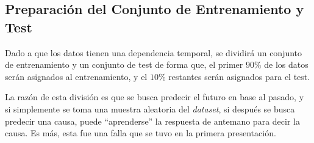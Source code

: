 




\subsection{Preparación del Conjunto de Entrenamiento y Test}
Dado a que los datos tienen una dependencia temporal, se dividirá un conjunto de entrenamiento y un conjunto de test de forma que, el primer $90\%$ de los datos serán asignados al entrenamiento, y el $10\%$ restantes serán asignados para el test. 

La razón de esta división es que se busca predecir el futuro en base al pasado, y si simplemente se toma una muestra aleatoria del \textit{dataset}, si después se busca predecir una causa, puede ``aprenderse'' la respuesta de antemano para decir la causa. Es más, esta fue una falla que se tuvo en la primera presentación.

